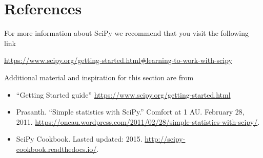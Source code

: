 \section{References}\label{references}

For more information about SciPy we recommend that you visit the following link

\url{https://www.scipy.org/getting-started.html#learning-to-work-with-scipy}

Additional material and inspiration for this section are from

\begin{itemize}
\item ``Getting Started guide'' \url{https://www.scipy.org/getting-started.html}
\item
  Prasanth. ``Simple statistics with SciPy.'' Comfort at 1 AU. 
  February 28, 2011.   \url{https://oneau.wordpress.com/2011/02/28/simple-statistics-with-scipy/}.
\item
  SciPy Cookbook. Lasted updated: 2015. 
  \url{http://scipy-cookbook.readthedocs.io/}. 
\end{itemize}
